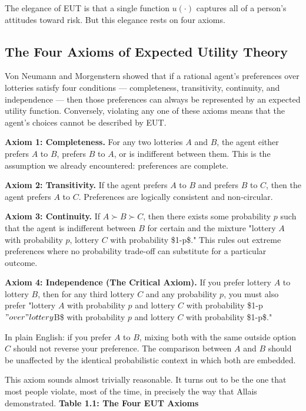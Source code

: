 \documentclass[12pt, letterpaper]{article}
\begin{document}
The elegance of EUT is that a single function $u(\cdot)$ captures all of a person's attitudes toward risk. But this elegance rests on four axioms.

\medskip


\subsection{The Four Axioms of Expected Utility Theory}


Von Neumann and Morgenstern showed that if a rational agent's preferences over lotteries satisfy four conditions --- completeness, transitivity, continuity, and independence --- then those preferences can always be represented by an expected utility function. Conversely, violating any one of these axioms means that the agent's choices cannot be described by EUT.

\textbf{Axiom 1: Completeness.} For any two lotteries $A$ and $B$, the agent either prefers $A$ to $B$, prefers $B$ to $A$, or is indifferent between them. This is the assumption we already encountered: preferences are complete.

\textbf{Axiom 2: Transitivity.} If the agent prefers $A$ to $B$ and prefers $B$ to $C$, then the agent prefers $A$ to $C$. Preferences are logically consistent and non-circular.

\textbf{Axiom 3: Continuity.} If $A \succ B \succ C$, then there exists some probability $p$ such that the agent is indifferent between $B$ for certain and the mixture "lottery $A$ with probability $p$, lottery $C$ with probability \$1-p\$." This rules out extreme preferences where no probability trade-off can substitute for a particular outcome.

\textbf{Axiom 4: Independence (The Critical Axiom).} If you prefer lottery $A$ to lottery $B$, then for any third lottery $C$ and any probability $p$, you must also prefer "lottery $A$ with probability $p$ and lottery $C$ with probability \$1-p$" over "lottery $B\$ with probability $p$ and lottery $C$ with probability \$1-p\$."

In plain English: if you prefer $A$ to $B$, mixing both with the same outside option $C$ should not reverse your preference. The comparison between $A$ and $B$ should be unaffected by the identical probabilistic context in which both are embedded.

This axiom sounds almost trivially reasonable. It turns out to be the one that most people violate, most of the time, in precisely the way that Allais demonstrated.
\newpage
\textbf{Table 1.1: The Four EUT Axioms}
\end{document}
